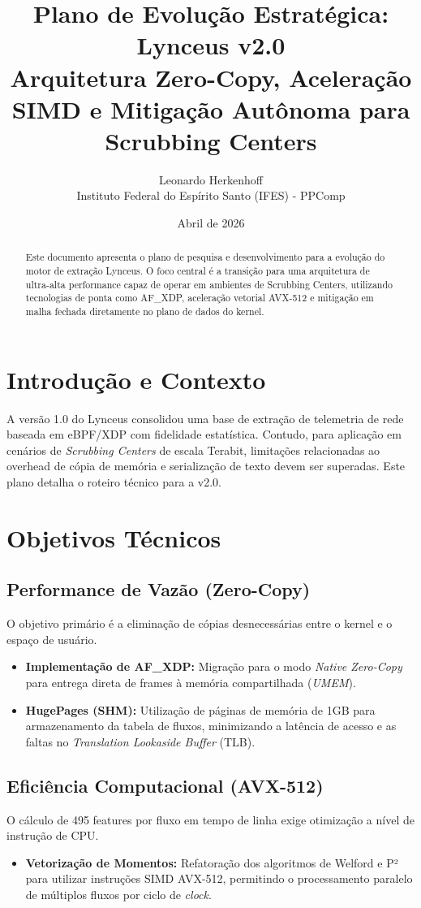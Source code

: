 \documentclass[a4paper,12pt]{article}
\title{Plano de Evolução Estratégica: Lynceus v2.0 \\ \large Arquitetura Zero-Copy, Aceleração SIMD e Mitigação Autônoma para Scrubbing Centers}
\author{Leonardo Herkenhoff \\ \small Instituto Federal do Espírito Santo (IFES) - PPComp}
\date{Abril de 2026}
\begin{document}
\maketitle

\begin{abstract}
Este documento apresenta o plano de pesquisa e desenvolvimento para a evolução do motor de extração Lynceus. O foco central é a transição para uma arquitetura de ultra-alta performance capaz de operar em ambientes de Scrubbing Centers, utilizando tecnologias de ponta como AF\_XDP, aceleração vetorial AVX-512 e mitigação em malha fechada diretamente no plano de dados do kernel.
\end{abstract}

\tableofcontents

\newpage

\section{Introdução e Contexto}
A versão 1.0 do Lynceus consolidou uma base de extração de telemetria de rede baseada em eBPF/XDP com fidelidade estatística. Contudo, para aplicação em cenários de \textit{Scrubbing Centers} de escala Terabit, limitações relacionadas ao overhead de cópia de memória e serialização de texto devem ser superadas. Este plano detalha o roteiro técnico para a v2.0.

\section{Objetivos Técnicos}

\subsection{Performance de Vazão (Zero-Copy)}
O objetivo primário é a eliminação de cópias desnecessárias entre o kernel e o espaço de usuário.
\begin{itemize}
    \item \textbf{Implementação de AF\_XDP:} Migração para o modo \textit{Native Zero-Copy} para entrega direta de frames à memória compartilhada (\textit{UMEM}).
    \item \textbf{HugePages (SHM):} Utilização de páginas de memória de 1GB para armazenamento da tabela de fluxos, minimizando a latência de acesso e as faltas no \textit{Translation Lookaside Buffer} (TLB).
\end{itemize}

\subsection{Eficiência Computacional (AVX-512)}
O cálculo de 495 features por fluxo em tempo de linha exige otimização a nível de instrução de CPU.
\begin{itemize}
    \item \textbf{Vetorização de Momentos:} Refatoração dos algoritmos de Welford e P² para utilizar instruções SIMD AVX-512, permitindo o processamento paralelo de múltiplos fluxos por ciclo de \textit{clock}.
\end{itemize}
\end{document}

